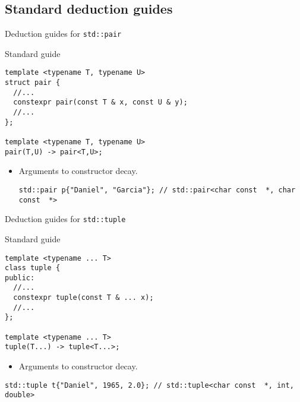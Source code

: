 \subsection{Standard deduction guides}

\begin{frame}[t,fragile]{Deduction guides for \texttt{std::pair}}
\begin{block}{Standard guide}
\begin{lstlisting}
template <typename T, typename U>
struct pair {
  //...
  constexpr pair(const T & x, const U & y);
  //...
};

template <typename T, typename U>
pair(T,U) -> pair<T,U>;
\end{lstlisting}
\end{block}

\begin{itemize}
  \item Arguments to  constructor decay.
\begin{lstlisting}
std::pair p{"Daniel", "Garcia"}; // std::pair<char const  *, char const  *>
\end{lstlisting}
\end{itemize}

\end{frame}

\begin{frame}[t,fragile]{Deduction guides for \texttt{std::tuple}}
\begin{block}{Standard guide}
\begin{lstlisting}
template <typename ... T>
class tuple {
public:
  //...
  constexpr tuple(const T & ... x);
  //...
};

template <typename ... T>
tuple(T...) -> tuple<T...>;
\end{lstlisting}
\end{block}

\begin{itemize}
  \item Arguments to  constructor decay.
\end{itemize}
\begin{lstlisting}
std::tuple t{"Daniel", 1965, 2.0}; // std::tuple<char const  *, int, double>
\end{lstlisting}
\end{frame}

